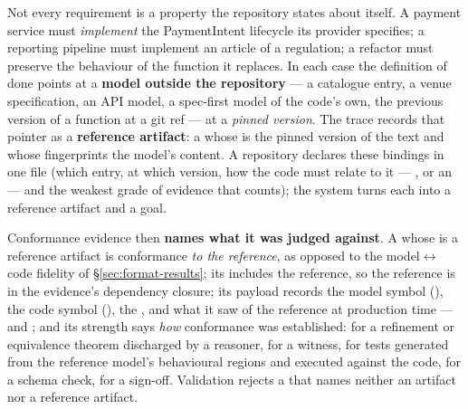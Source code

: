 Not every requirement is a property the repository states about itself. A payment service must
\emph{implement} the PaymentIntent lifecycle its provider specifies; a reporting pipeline must implement an
article of a regulation; a refactor must preserve the behaviour of the function it replaces. In each case
the definition of done points at a \textbf{model outside the repository} --- a catalogue entry, a venue
specification, an API model, a spec-first model of the code's own, the previous version of a function at a
git ref --- at a \emph{pinned version}. The trace records that pointer as a \textbf{reference artifact}:
a  whose  is the pinned version of the text and whose
 fingerprints the model's content. A repository declares these bindings in one file
(which entry, at which version, how the code must relate to it --- , 
or an  --- and the weakest grade of evidence that counts); the system turns each into a
reference artifact and a goal.

Conformance evidence then \textbf{names what it was judged against}. A  whose
 is a reference artifact is conformance \emph{to the reference}, as opposed
to the model$\leftrightarrow$code fidelity of \S\ref{sec:format-results}; its  includes
the reference, so the reference is in the evidence's dependency closure; its payload records the model
symbol (), the code symbol (), the , and
what it saw of the reference at production time ---  and
; and its strength says \emph{how} conformance was established:  for
a refinement or equivalence theorem discharged by a reasoner,  for a witness,  for
tests generated from the reference model's behavioural regions and executed against the code,
 for a schema check,  for a sign-off. Validation rejects a
 that names neither an artifact nor a reference artifact.

